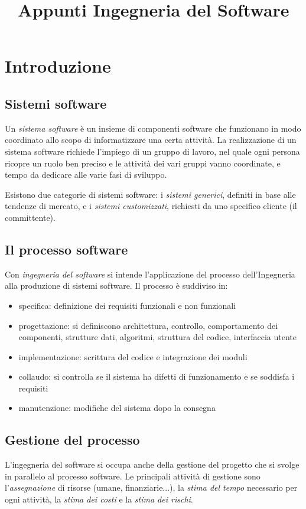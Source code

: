 \documentclass[11pt]{article}
\title{Appunti Ingegneria del Software}
\begin{document}
\section{Introduzione}
\subsection{Sistemi software}
Un \textit{sistema software} è un insieme di componenti software che funzionano in modo coordinato allo scopo di informatizzare 
una certa attività. La realizzazione di un sistema software richiede l'impiego di un gruppo di lavoro, nel quale ogni 
persona ricopre un ruolo ben preciso e le attività dei vari gruppi vanno coordinate, e tempo da dedicare alle varie fasi 
di sviluppo.

Esistono due categorie di sistemi software: i \textit{sistemi generici}, definiti in base alle tendenze di mercato, e i 
\textit{sistemi customizzati}, richiesti da uno specifico cliente (il committente).
\subsection{Il processo software}
Con \textit{ingegneria del software} si intende l'applicazione del processo dell'Ingegneria alla produzione di sistemi 
software. Il processo è suddiviso in:
\begin{itemize}
    \item specifica: definizione dei requisiti funzionali e non funzionali 
    \item progettazione: si definiscono architettura, controllo, comportamento dei componenti, strutture dati, algoritmi,
    struttura del codice, interfaccia utente
    \item implementazione: scrittura del codice e integrazione dei moduli 
    \item collaudo: si controlla se il sistema ha difetti di funzionamento e se soddisfa i requisiti 
    \item manutenzione: modifiche del sistema dopo la consegna 
\end{itemize}
\subsection{Gestione del processo}
L'ingegneria del software si occupa anche della gestione del progetto che si svolge in parallelo al processo software.
Le principali attività di gestione sono l'\textit{assegnazione} di risorse (umane, finanziarie...), la \textit{stima del tempo}
necessario per ogni attività, la \textit{stima dei costi} e la \textit{stima dei rischi}.
\end{document}
